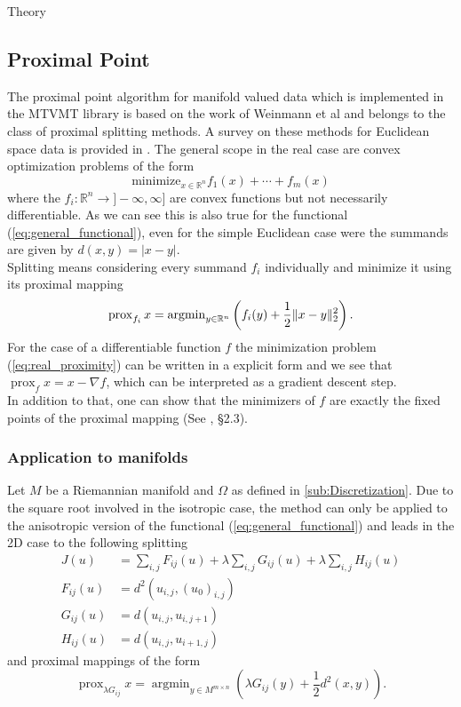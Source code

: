 \begin{chapter}{Theory}
\subsection{Proximal Point} %
\label{sub:ProximalPoint}
The proximal point algorithm for manifold valued data which is implemented in the MTVMT library is based on the work of Weinmann et al\cite{Weinmann} and belongs to the class
of proximal splitting methods. A survey on these methods for Euclidean space data is provided in \cite{CombettesPequet}. The general scope in the real case are convex
optimization problems of the form
\begin{equation}
    \text{minimize}_{x\in \mathbb{R}^n} f_1(x) + \cdots +f_m(x)
\end{equation}
where the $f_i:\mathbb{R}^n\to]-\infty,\infty]$ are convex functions but not necessarily differentiable. As we can see this is also true for the functional (\ref{eq:general_functional}),
even for the simple Euclidean case were the summands are given by $d(x,y)=|x-y|$. \\
Splitting means considering every summand $f_i$ individually and minimize it using its proximal mapping
\begin{equation}
    \label{eq:real_proximity}
    \operatorname{prox}_{f_i}x=\operatorname{argmin}_{y\in\mathbb{R}^n}\left(f_i(y) + \frac{1}{2}\| x-y \|^2_{2} \right).
\end{equation}
For the case of a differentiable function $f$ the minimization problem (\ref{eq:real_proximity}) 
can be written in a explicit form and we see that $\operatorname{prox}_f x = x-\nabla f$, which 
can be interpreted as a gradient descent step.\\
In addition to that, one can show that the minimizers of $f$ are exactly the fixed points of the proximal mapping (See \cite{ParikhBoyd}, \S 2.3).

\subsubsection{Application to manifolds} %
\label{ssub:Application to manifolds}
Let $M$ be a Riemannian manifold and $\Omega$ as defined in \ref{sub:Discretization}. Due to the square root involved in the isotropic case,
the method can only be applied to the anisotropic version of the functional (\ref{eq:general_functional}) and leads in the 2D case to the following splitting
\begin{align}
    J(u)	&= \sum_{i,j}F_{ij}(u)+\lambda\sum_{i,j}G_{ij}(u)+\lambda\sum_{i,j}H_{ij}(u)\\
    F_{ij}(u)	&=  d^{2}(u_{i,j},(u_0)_{i,j})\\
    G_{ij}(u)	&=  d(u_{i,j},u_{i,j+1})\\
    H_{ij}(u)	&=  d(u_{i,j},u_{i+1,j})
\end{align}
and proximal mappings of the form
\begin{equation}
\label{eq:manifold_proximity}
\operatorname{prox}_{\lambda G_{ij}}x=\operatorname{argmin}_{y\in M^{m\times n}}\left(\lambda G_{ij}(y) +\frac{1}{2}d^2(x,y) \right).
\end{equation}


\end{chapter}
